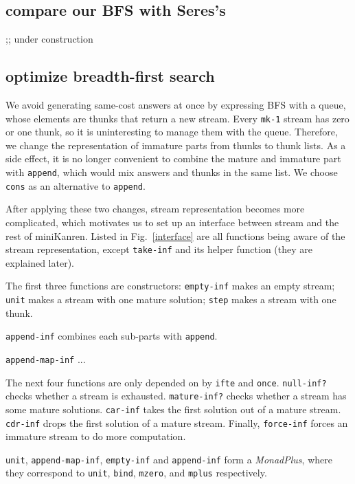 \documentclass[format=acmlarge, review=true, authordraft=true]{acmart}
\begin{document}
\subsection{compare our BFS with Seres's}

;; under construction


\subsection{optimize breadth-first search}

We avoid generating same-cost answers at once by expressing BFS with a queue, 
whose elements are thunks that return a new stream. Every \texttt{mk-1} stream has zero or one thunk, so it is uninteresting to manage them with the queue. Therefore, we change the representation of immature parts from thunks to 
thunk lists. As a side effect, it is no longer convenient to combine the mature and immature part with \texttt{append}, which would mix answers and thunks in the same list. We choose \texttt{cons} as an alternative to \texttt{append}.

After applying these two changes, stream representation becomes more 
complicated, which motivates us to set up an interface between stream 
and the rest of miniKanren. Listed in Fig.~\ref{interface} are all functions 
being aware of the stream representation, except \texttt{take-inf} and its helper function (they are explained later).

The first three functions are constructors: \texttt{empty-inf} makes an 
empty stream; \texttt{unit} makes a stream with one mature 
solution; \texttt{step} makes a stream with one thunk. 

\texttt{append-inf} combines each sub-parts with \texttt{append}.

\texttt{append-map-inf} ...

The next four functions are only depended on by \texttt{ifte} and \texttt{once}. \texttt{null-inf?} checks whether a stream is exhausted. \texttt{mature-inf?} checks whether a stream has some mature 
solutions. \texttt{car-inf} takes the first solution out of a mature stream. 
\texttt{cdr-inf} drops the first solution of a mature stream. Finally, 
\texttt{force-inf} forces an immature stream to do more computation.

\texttt{unit}, \texttt{append-map-inf}, \texttt{empty-inf} and 
\texttt{append-inf} form a \emph{MonadPlus}, where they correspond to 
\texttt{unit}, \texttt{bind}, \texttt{mzero}, and \texttt{mplus} respectively.
\end{document}
